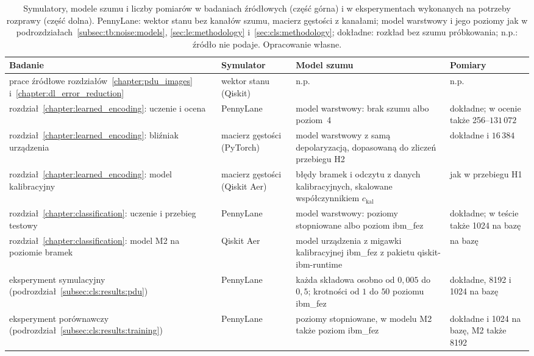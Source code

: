 \begin{table}[!tb]
\centering
\caption[Symulatory, modele szumu i liczby pomiarów]{Symulatory, modele szumu i liczby pomiarów w badaniach źródłowych (część górna) i w eksperymentach wykonanych na potrzeby rozprawy (część dolna).
PennyLane: wektor stanu bez kanałów szumu, macierz gęstości z kanałami; model warstwowy i jego poziomy jak w podrozdziałach~\ref{subsec:tb:noise:models}, \ref{sec:le:methodology} i~\ref{sec:cls:methodology}; dokładne: rozkład bez szumu próbkowania; n.p.: źródło nie podaje.
Opracowanie własne.}
\label{tab:app:env:simulators}
\footnotesize
\setlength{\tabcolsep}{4pt}
\begin{tabular}{@{}>{\raggedright\arraybackslash}p{4.2cm}>{\raggedright\arraybackslash}p{3.0cm}>{\raggedright\arraybackslash}p{4.9cm}>{\raggedright\arraybackslash}p{2.7cm}@{}}
\toprule
\textbf{Badanie} & \textbf{Symulator} & \textbf{Model szumu} & \textbf{Pomiary} \\
\midrule
prace źródłowe rozdziałów~\ref{chapter:pdu_images} i~\ref{chapter:dl_error_reduction} & wektor stanu (Qiskit) & n.p. & n.p. \\
rozdział~\ref{chapter:learned_encoding}: uczenie i ocena & PennyLane & model warstwowy: brak szumu albo poziom~4 & dokładne; w ocenie także 256--$131\,072$ \\
rozdział~\ref{chapter:learned_encoding}: bliźniak urządzenia & macierz gęstości (PyTorch) & model warstwowy z samą depolaryzacją, dopasowaną do zliczeń przebiegu H2 & dokładne i $16\,384$ \\
rozdział~\ref{chapter:learned_encoding}: model kalibracyjny & macierz gęstości (Qiskit Aer) & błędy bramek i odczytu z danych kalibracyjnych, skalowane współczynnikiem $c_{\mathrm{kal}}$ & jak w przebiegu H1 \\
rozdział~\ref{chapter:classification}: uczenie i przebieg testowy & PennyLane & model warstwowy: poziomy stopniowane albo poziom ibm\_fez & dokładne; w teście także 1024 na bazę \\
rozdział~\ref{chapter:classification}: model M2 na poziomie bramek & Qiskit Aer & model urządzenia z migawki kalibracyjnej ibm\_fez z pakietu qiskit-ibm-runtime & 1024 na bazę \\
\midrule
eksperyment symulacyjny (podrozdział~\ref{subsec:cls:results:pdu}) & PennyLane & każda składowa osobno od $0{,}005$ do $0{,}5$; krotności od $1$ do $50$ poziomu ibm\_fez & dokładne, 8192 i 1024 na bazę \\
eksperyment porównawczy (podrozdział~\ref{subsec:cls:results:training}) & PennyLane & poziomy stopniowane, w modelu M2 także poziom ibm\_fez & dokładne i 1024 na bazę, M2 także 8192 \\

\end{tabular}
\end{table}

